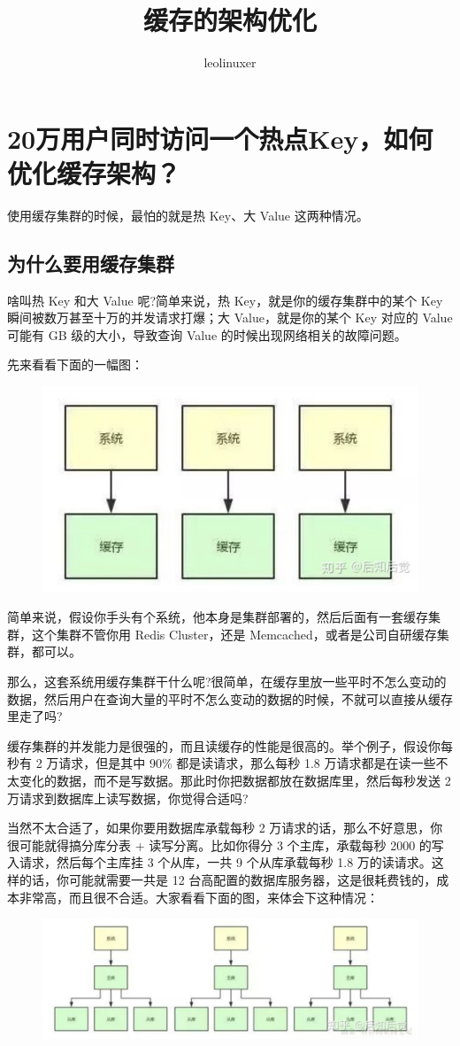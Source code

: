 \documentclass[12pt]{article}
\title{缓存的架构优化\cite{Optimize_Cache_Infrastructure}}
\author{leolinuxer}
\begin{document}
\maketitle
\tableofcontents

\section{20万用户同时访问一个热点Key，如何优化缓存架构？}
使用缓存集群的时候，最怕的就是热 Key、大 Value 这两种情况。

\subsection{为什么要用缓存集群}
啥叫热 Key 和大 Value 呢?简单来说，热 Key，就是你的缓存集群中的某个 Key 瞬间被数万甚至十万的并发请求打爆；大 Value，就是你的某个 Key 对应的 Value 可能有 GB 级的大小，导致查询 Value 的时候出现网络相关的故障问题。

先来看看下面的一幅图：
\begin{figure}[H]
    \centering
    \includegraphics[width=.5\textwidth]{fig/Cache_Infrastructure_Hot_Key_1.png}
\end{figure}

简单来说，假设你手头有个系统，他本身是集群部署的，然后后面有一套缓存集群，这个集群不管你用 Redis Cluster，还是 Memcached，或者是公司自研缓存集群，都可以。

那么，这套系统用缓存集群干什么呢?很简单，在缓存里放一些平时不怎么变动的数据，然后用户在查询大量的平时不怎么变动的数据的时候，不就可以直接从缓存里走了吗?

缓存集群的并发能力是很强的，而且读缓存的性能是很高的。举个例子，假设你每秒有 2 万请求，但是其中 90\% 都是读请求，那么每秒 1.8 万请求都是在读一些不太变化的数据，而不是写数据。那此时你把数据都放在数据库里，然后每秒发送 2 万请求到数据库上读写数据，你觉得合适吗?

当然不太合适了，如果你要用数据库承载每秒 2 万请求的话，那么不好意思，你很可能就得搞分库分表 + 读写分离。比如你得分 3 个主库，承载每秒 2000 的写入请求，然后每个主库挂 3 个从库，一共 9 个从库承载每秒 1.8 万的读请求。这样的话，你可能就需要一共是 12 台高配置的数据库服务器，这是很耗费钱的，成本非常高，而且很不合适。大家看看下面的图，来体会下这种情况：
\begin{figure}[H]
    \centering
    \includegraphics[width=.6\textwidth]{fig/Cache_Infrastructure_Hot_Key_2.png}
\end{figure}
\end{document}
